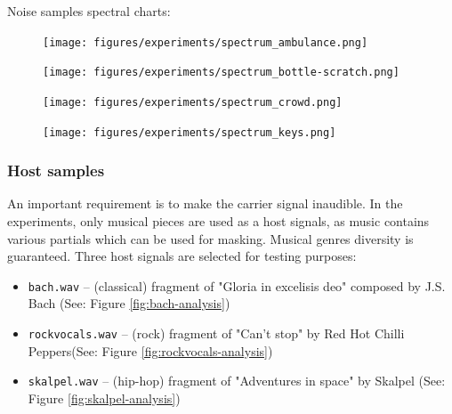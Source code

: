 \documentclass[english,bachelor,a4paper,oneside]{ppfcmthesis}
\begin{document}
\clearpage

Noise samples spectral charts:

\begin{figure}[!hb]
\centering
\begin{minipage}[b]{0.45\textwidth}
  \texttt{[image: figures/experiments/spectrum\_ambulance.png]}
  \label{fig:ambulance-analysis}
\end{minipage}\hfill
\begin{minipage}[b]{0.45\linewidth}
  \texttt{[image: figures/experiments/spectrum\_bottle-scratch.png]}
  \label{fig:bottle-scratch-analysis}
\end{minipage}
\end{figure}
\begin{figure}[!hb]
\begin{minipage}[b]{0.45\textwidth}
  \texttt{[image: figures/experiments/spectrum\_crowd.png]}
  \label{fig:crowd-analysis}
\end{minipage}\hfill
\begin{minipage}[b]{0.45\textwidth}
  \texttt{[image: figures/experiments/spectrum\_keys.png]}
  \label{fig:keys-analysis}
\end{minipage}
\end{figure}

\subsubsection{Host samples}
An important requirement is to make the carrier signal inaudible. In the experiments, only musical pieces
are used as a host signals, as music contains various partials which can be used for masking. Musical genres diversity is guaranteed.
Three host signals are selected for testing purposes:
\begin{itemize}
  \item \verb|bach.wav| -- (classical) fragment of "Gloria in excelisis deo" composed by J.S. Bach (See: Figure \ref{fig:bach-analysis})
  \item \verb|rockvocals.wav| -- (rock) fragment of "Can't stop" by Red Hot Chilli Peppers(See: Figure \ref{fig:rockvocals-analysis})
  \item \verb|skalpel.wav| -- (hip-hop) fragment of "Adventures in space" by Skalpel (See: Figure \ref{fig:skalpel-analysis})
\end{itemize}
\end{document}

